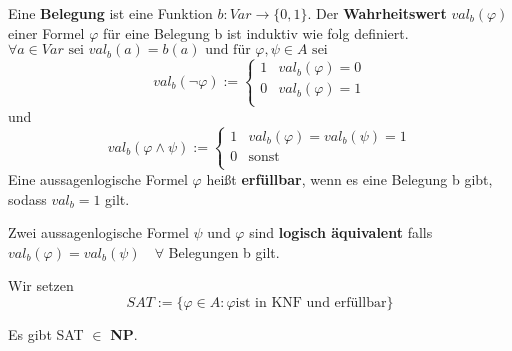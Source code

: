     Eine \textbf{Belegung} ist eine Funktion \(b : Var \to \{0,1\}\). Der \textbf{Wahrheitswert} \(val_b(\varphi)\) einer Formel \(\varphi\) für eine Belegung b ist induktiv wie folg definiert. 
    \vspace*{0.5cm}
    \\
    \(
        \forall a \in Var \text{ sei } val_b(a) = b(a) \text{ und für } \varphi, \psi \in A \text{ sei} 
    \)
    \begin{equation}
        val_b(\lnot \varphi) := 
        \begin{cases}
            1 & val_b(\varphi) = 0\\
            0 & val_b(\varphi) = 1\\
        \end{cases}    
    \end{equation}
    und 
    \begin{equation}
        val_b(\varphi \wedge \psi) := 
        \begin{cases}
            1 & val_b(\varphi) = val_b(\psi) = 1\\
            0 & \text{sonst}\\
        \end{cases}    
    \end{equation}
    Eine aussagenlogische Formel \(\varphi\) heißt \textbf{erfüllbar}, wenn es eine Belegung b gibt, sodass \(val_b = 1\) gilt.

    Zwei aussagenlogische Formel \(\psi\) und \(\varphi\) sind \textbf{logisch äquivalent} falls \(val_b(\varphi) = val_b(\psi) \quad \forall\) Belegungen b gilt.

    Wir setzen 
    \[
        SAT := \{\varphi \in A : \varphi \text{ist in KNF und erfüllbar}\}  
    \]

    Es gibt SAT \(\in\) \textbf{NP}.

\newpage


